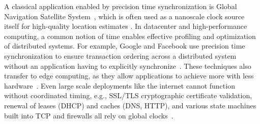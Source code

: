 A classical application enabled by precision time synchronization
is Global Navigation Satellite System~\cite{intro-to-gnss},
which is often used as a nanoscale clock source itself for high-quality location estimates
\cite{gnss-location-and-time-advances,gnss-for-high-precision-timing}.
%
%
In datacenter and high-performance computing,
a common notion of time enables effective profiling and optimization of distributed systems.
For example, Google and Facebook use precision time synchronization to ensure transaction ordering across a distributed system without an application having to explicitly synchronize~\cite{corbett2013spanner,li2020sundial,ouellete2023precision}.
These techniques also transfer to edge computing, as they allow applications to achieve more with less hardware~\cite{chen2021achieving, wang2019frame}.
Even large scale deployments like the internet cannot function without coordinated timing,
e.g., SSL/TLS cryptographic certificate validation, renewal of leases (DHCP) and caches (DNS, HTTP), and various state machines built into TCP and firewalls all rely on global clocks~\cite{??}.

